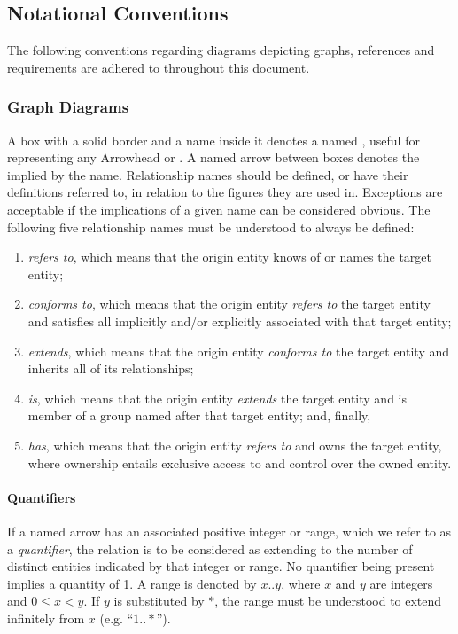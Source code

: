 \newpage

\subsection{Notational Conventions}
\label{sec:introduction:conventions}

The following conventions regarding diagrams depicting graphs, references and requirements are adhered to throughout this document.

\subsubsection{Graph Diagrams}

A box with a solid border and a name inside it denotes a named , useful for representing any Arrowhead  or .
A named arrow between boxes denotes the  implied by the name.
Relationship names should be defined, or have their definitions referred to, in relation to the figures they are used in.
Exceptions are acceptable if the implications of a given name can be considered obvious.
The following five relationship names must be understood to always be defined:

\begin{enumerate}
\item \textit{refers to}, which means that the origin entity knows of or names the target entity;
\item \textit{conforms to}, which means that the origin entity \textit{refers to} the target entity and satisfies all  implicitly and/or explicitly associated with that target entity;
\item \textit{extends}, which means that the origin entity \textit{conforms to} the target entity and inherits all of its relationships;
\item \textit{is}, which means that the origin entity \textit{extends} the target entity and is member of a group named after that target entity; and, finally,
\item \textit{has}, which means that the origin entity \textit{refers to} and owns the target entity, where ownership entails exclusive access to and control over the owned entity.
\end{enumerate}

\paragraph{Quantifiers}
If a named arrow has an associated positive integer or range, which we refer to as a \textit{quantifier}, the relation is to be considered as extending to the number of distinct entities indicated by that integer or range.
No quantifier being present implies a quantity of 1.
A range is denoted by $x..y$, where $x$ and $y$ are integers and $0 \leq x < y$.
If $y$ is substituted by $*$, the range must be understood to extend infinitely from $x$ (e.g. ``$1..*$'').

